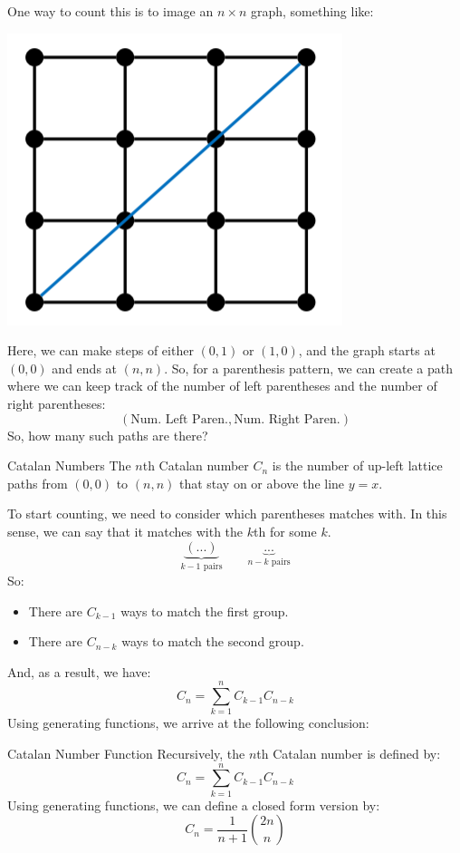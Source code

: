 \documentclass[letterpaper]{article}
\begin{document}
\bigskip 

One way to count this is to image an $n \times n$ graph, something like:
\begin{center}
    \includegraphics[scale=0.6]{graph_cat.PNG}
\end{center}
Here, we can make steps of either $(0, 1)$ or $(1, 0)$, and the graph starts at $(0, 0)$ and ends at $(n, n)$. So, for a parenthesis pattern, we can create a path where we can keep track of the number of left parentheses and the number of right parentheses:
\[(\text{Num. Left Paren.}, \text{Num. Right Paren.})\]
So, how many such paths are there? 
\begin{definition}{Catalan Numbers}{}
    The $n$th Catalan number $C_n$ is the number of up-left lattice paths from $(0, 0)$ to $(n, n)$ that stay on or above the line $y = x$.
\end{definition}
To start counting, we need to consider which parentheses \code{(} matches with. In this sense, we can say that it matches with the $k$th \code{)} for some $k$. 
\[\underbrace{(...)}_{k - 1 \text{ pairs}} \qquad \underbrace{...}_{n - k \text{ pairs}}\]
So:
\begin{itemize}
    \item There are $C_{k - 1}$ ways to match the first group.
    \item There are $C_{n - k}$ ways to match the second group. 
\end{itemize}
And, as a result, we have:
\[C_n = \sum_{k = 1}^{n} C_{k - 1} C_{n - k}\]
Using generating functions, we arrive at the following conclusion:
\begin{definition}{Catalan Number Function}{}
    Recursively, the $n$th Catalan number is defined by:
    \[C_n = \sum_{k = 1}^n C_{k - 1}C_{n - k}\]
    Using generating functions, we can define a closed form version by:
    \[C_n = \frac{1}{n + 1} \binom{2n}{n}\]
\end{definition}
\end{document}
